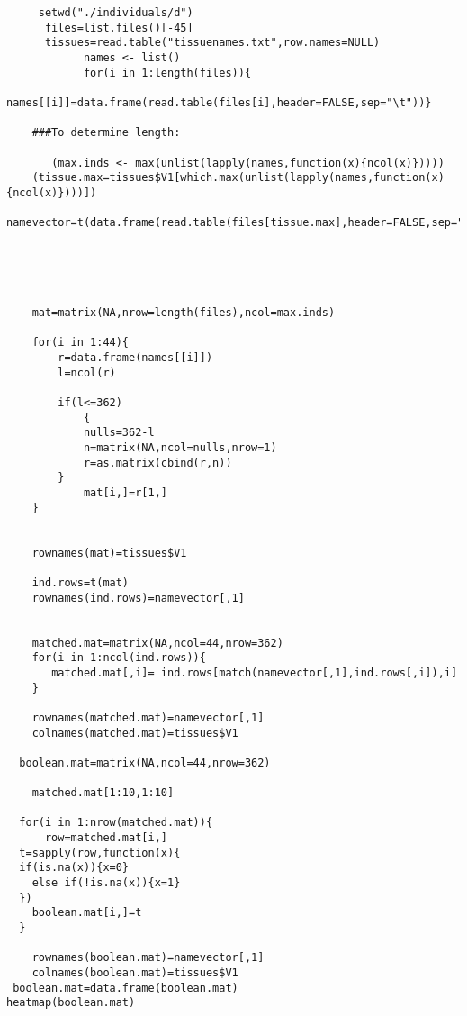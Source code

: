 \documentclass[11pt]{article}
\begin{document}
\lstset{breaklines,language=R}
\begin{lstlisting}
     setwd("./individuals/d")
      files=list.files()[-45]
      tissues=read.table("tissuenames.txt",row.names=NULL)
            names <- list()
            for(i in 1:length(files)){
                names[[i]]=data.frame(read.table(files[i],header=FALSE,sep="\t"))}

    ###To determine length:

       (max.inds <- max(unlist(lapply(names,function(x){ncol(x)}))))
    (tissue.max=tissues$V1[which.max(unlist(lapply(names,function(x){ncol(x)})))])
    namevector=t(data.frame(read.table(files[tissue.max],header=FALSE,sep="\t")))





    mat=matrix(NA,nrow=length(files),ncol=max.inds)

    for(i in 1:44){
        r=data.frame(names[[i]])
        l=ncol(r)

        if(l<=362)
            {
            nulls=362-l
            n=matrix(NA,ncol=nulls,nrow=1)
            r=as.matrix(cbind(r,n))
        }
            mat[i,]=r[1,]
    }


    rownames(mat)=tissues$V1

    ind.rows=t(mat)
    rownames(ind.rows)=namevector[,1]


    matched.mat=matrix(NA,ncol=44,nrow=362)
    for(i in 1:ncol(ind.rows)){
       matched.mat[,i]= ind.rows[match(namevector[,1],ind.rows[,i]),i]
    }

    rownames(matched.mat)=namevector[,1]
    colnames(matched.mat)=tissues$V1

  boolean.mat=matrix(NA,ncol=44,nrow=362)

    matched.mat[1:10,1:10]

  for(i in 1:nrow(matched.mat)){
      row=matched.mat[i,]
  t=sapply(row,function(x){
  if(is.na(x)){x=0}
    else if(!is.na(x)){x=1}
  })
    boolean.mat[i,]=t
  }

    rownames(boolean.mat)=namevector[,1]
    colnames(boolean.mat)=tissues$V1
 boolean.mat=data.frame(boolean.mat)
heatmap(boolean.mat)
\end{lstlisting}
\end{document}
